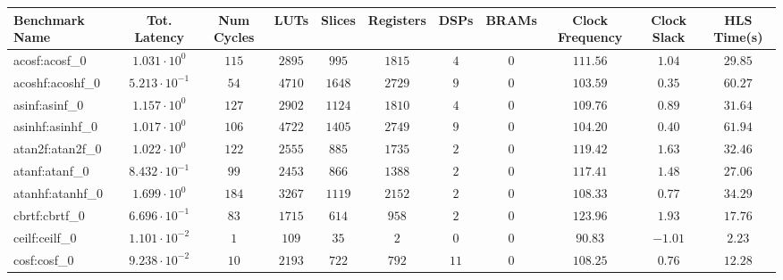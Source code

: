 \begin{tabular}{|l|c|c|c|c|c|c|c|c|c|c|}
\hline
Benchmark Name               & Tot. Latency            & Num Cycles & LUTs      & Slices    & Registers & DSPs    & BRAMs & Clock Frequency & Clock Slack & HLS Time(s) \\
\hline
acosf:acosf\_0               & $ 1.031 \cdot 10^{0}  $ & $ 115    $ & $ 2895  $ & $ 995   $ & $ 1815  $ & $ 4   $ & $ 0 $ & $ 111.56      $ & $ 1.04    $ & $ 29.85   $ \\
acoshf:acoshf\_0             & $ 5.213 \cdot 10^{-1} $ & $ 54     $ & $ 4710  $ & $ 1648  $ & $ 2729  $ & $ 9   $ & $ 0 $ & $ 103.59      $ & $ 0.35    $ & $ 60.27   $ \\
asinf:asinf\_0               & $ 1.157 \cdot 10^{0}  $ & $ 127    $ & $ 2902  $ & $ 1124  $ & $ 1810  $ & $ 4   $ & $ 0 $ & $ 109.76      $ & $ 0.89    $ & $ 31.64   $ \\
asinhf:asinhf\_0             & $ 1.017 \cdot 10^{0}  $ & $ 106    $ & $ 4722  $ & $ 1405  $ & $ 2749  $ & $ 9   $ & $ 0 $ & $ 104.20      $ & $ 0.40    $ & $ 61.94   $ \\
atan2f:atan2f\_0             & $ 1.022 \cdot 10^{0}  $ & $ 122    $ & $ 2555  $ & $ 885   $ & $ 1735  $ & $ 2   $ & $ 0 $ & $ 119.42      $ & $ 1.63    $ & $ 32.46   $ \\
atanf:atanf\_0               & $ 8.432 \cdot 10^{-1} $ & $ 99     $ & $ 2453  $ & $ 866   $ & $ 1388  $ & $ 2   $ & $ 0 $ & $ 117.41      $ & $ 1.48    $ & $ 27.06   $ \\
atanhf:atanhf\_0             & $ 1.699 \cdot 10^{0}  $ & $ 184    $ & $ 3267  $ & $ 1119  $ & $ 2152  $ & $ 2   $ & $ 0 $ & $ 108.33      $ & $ 0.77    $ & $ 34.29   $ \\
cbrtf:cbrtf\_0               & $ 6.696 \cdot 10^{-1} $ & $ 83     $ & $ 1715  $ & $ 614   $ & $ 958   $ & $ 2   $ & $ 0 $ & $ 123.96      $ & $ 1.93    $ & $ 17.76   $ \\
ceilf:ceilf\_0               & $ 1.101 \cdot 10^{-2} $ & $ 1      $ & $ 109   $ & $ 35    $ & $ 2     $ & $ 0   $ & $ 0 $ & $ 90.83       $ & $ -1.01   $ & $ 2.23    $ \\
cosf:cosf\_0                 & $ 9.238 \cdot 10^{-2} $ & $ 10     $ & $ 2193  $ & $ 722   $ & $ 792   $ & $ 11  $ & $ 0 $ & $ 108.25      $ & $ 0.76    $ & $ 12.28   $ \\

\end{tabular}
